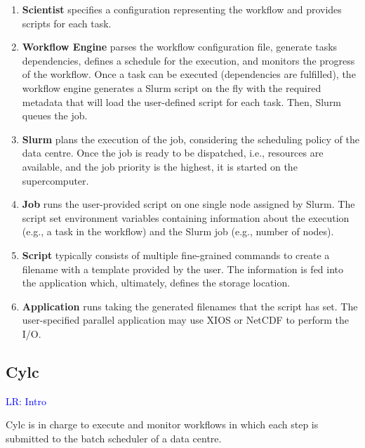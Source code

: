 \documentclass{superfri}
\newcommand{\lr}[1]{\textcolor{blue}{LR: #1}}
\begin{document}
\begin{enumerate}

  \item \textbf{Scientist} specifies a configuration representing the workflow and provides scripts for each task.

  \item \textbf{Workflow Engine} parses the workflow configuration file, generate tasks dependencies, defines a schedule for the execution, and monitors the progress of the workflow.
  Once a task can be executed (dependencies are fulfilled), the workflow engine generates a Slurm script on the fly with the required metadata that will load the user-defined script for each task. Then, Slurm queues the job.

  \item \textbf{Slurm} plans the execution of the job, considering the scheduling policy of the data centre.
  Once the job is ready to be dispatched, i.e., resources are available, and the job priority is the highest, it is started on the supercomputer.

  \item \textbf{Job} runs the user-provided script on one single node assigned by Slurm.
  The script set environment variables containing information about the execution (e.g., a task in the workflow) and the Slurm job (e.g., number of nodes).

  \item \textbf{Script} typically consists of multiple fine-grained commands to create a filename with a template provided by the user. The information is fed into the application which, ultimately, defines the storage location.

  \item \textbf{Application} runs taking the generated filenames that the script has set.
  The user-specified parallel application may use XIOS or NetCDF to perform the I/O.

\end{enumerate}

\subsection{Cylc}

\lr{Intro}

Cylc is in charge to execute and monitor workflows in which each step is submitted to the batch scheduler of a data centre.
\end{document}
